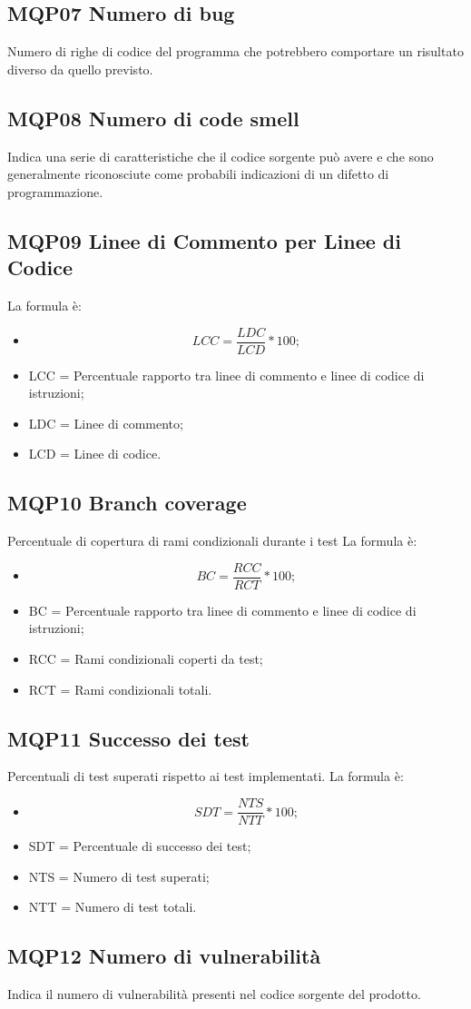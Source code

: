 \subsection{MQP07 Numero di bug}
Numero di righe di codice del programma che potrebbero comportare un risultato diverso da quello previsto.

\subsection{MQP08 Numero di code smell}
Indica una serie di caratteristiche che il codice sorgente può avere e che sono generalmente riconosciute come probabili indicazioni di un difetto di programmazione.

\subsection{MQP09 Linee di Commento per Linee di Codice}
La formula è:
\begin{itemize}
  \item[] \[LCC = \frac{LDC}{LCD} * 100 ;\]
  \item LCC = Percentuale rapporto tra linee di commento e linee di codice di istruzioni;
  \item LDC = Linee di commento;
  \item LCD = Linee di codice.
  \end{itemize}

\subsection{MQP10 Branch coverage}
Percentuale di copertura di rami condizionali durante i test
La formula è:
\begin{itemize}
  \item[] \[BC = \frac{RCC}{RCT} * 100 ;\]
  \item BC = Percentuale rapporto tra linee di commento e linee di codice di istruzioni;
  \item RCC = Rami condizionali coperti da test;
  \item RCT = Rami condizionali totali.
  \end{itemize}


\subsection{MQP11 Successo dei test}
Percentuali di test superati rispetto ai test implementati.
La formula è:
\begin{itemize}
  \item[] \[SDT = \frac{NTS}{NTT} * 100 ;\]
  \item SDT = Percentuale di successo dei test;
  \item NTS = Numero di test superati;
  \item NTT = Numero di test totali.
  \end{itemize}

\subsection{MQP12 Numero di vulnerabilità}
Indica il numero di vulnerabilità presenti nel codice sorgente del prodotto.

